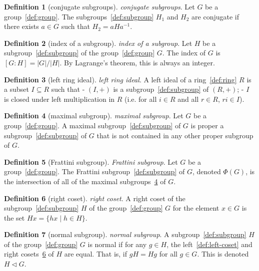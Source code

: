 \documentclass[12pt,a4paper]{article}
\theoremstyle{definition}
\newtheorem{definition}{Definition}
\begin{document}
\begin{definition}[conjugate subgroups]\label{def:conjugate-subgroups}
\emph{conjugate subgroups}. Let $G$ be a group~\ref{def:group}. The subgroups~\ref{def:subgroup} $H_1$ and $H_2$ are conjugate if there exists $a\in G$ such that $H_2= aHa^{-1}$.
\end{definition}

\begin{definition}[index of a subgroup]\label{def:index-of-a-subgroup}
\emph{index of a subgroup}. Let $H$ be a subgroup~\ref{def:subgroup} of the group~\ref{def:group} $G$. The index of $G$ is $[G:H] = \vert G\vert /\vert H\vert $. By Lagrange's theorem, this is always an integer.
\end{definition}

\begin{definition}[left ring ideal]\label{def:left-ring-ideal}
\emph{left ring ideal}. A left ideal of a ring~\ref{def:ring} $R$ is a subset $I\subseteq R$ such that 
- $(I,+)$ is a subgroup~\ref{def:subgroup} of $(R,+)$;
- $I$ is closed under left multiplication in $R$ (i.e. for all $i\in R$ and all $r\in R$, $ri \in I$).
\end{definition}

\begin{definition}[maximal subgroup]\label{def:maximal-subgroup}
\emph{maximal subgroup}. Let $G$ be a group~\ref{def:group}. A maximal subgroup~\ref{def:subgroup} of $G$ is proper a subgroup~\ref{def:subgroup} of $G$ that is not contained in any other proper subgroup of $G$.
\end{definition}

\begin{definition}[Frattini subgroup]\label{def:frattini-subgroup}
\emph{Frattini subgroup}. Let $G$ be a group~\ref{def:group}. The Frattini subgroup~\ref{def:subgroup} of $G$, denoted $\Phi(G)$, is the intersection of all of the maximal subgroups~\ref{def:maximal-subgroup} of $G$.
\end{definition}

\begin{definition}[right coset]\label{def:right-coset}
\emph{right coset}. A right coset of the subgroup~\ref{def:subgroup} $H$ of the group~\ref{def:group} $G$ for the element $x\in G$ is the set $Hx = \{hx\mid h \in H\}$.
\end{definition}

\begin{definition}[normal subgroup]\label{def:normal-subgroup}
\emph{normal subgroup}. A subgroup~\ref{def:subgroup} $H$ of the group~\ref{def:group} $G$ is normal if for any $g \in H$, the left~\ref{def:left-coset} and right cosets~\ref{def:right-coset} of $H$ are equal. That is, if $gH = Hg$ for all $g \in G$. This is denoted $H\triangleleft G$.
\end{definition}
\end{document}
